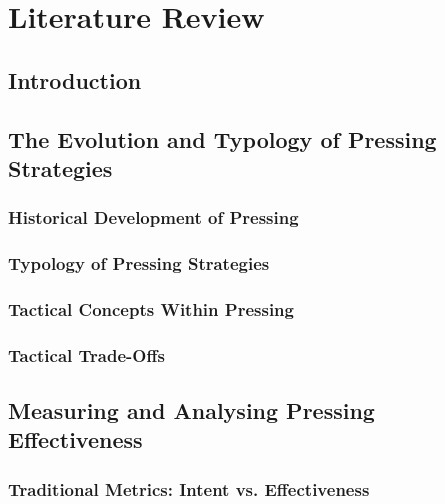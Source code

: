 \documentclass[12pt]{article}
\begin{document}
\tableofcontents
\pagebreak

\section{Literature Review}

\subsection{Introduction}




\subsection{The Evolution and Typology of Pressing Strategies}

\subsubsection{Historical Development of Pressing}



\subsubsection{Typology of Pressing Strategies}



\subsubsection{Tactical Concepts Within Pressing}



\subsubsection{Tactical Trade-Offs}


\subsection{Measuring and Analysing Pressing Effectiveness}

\subsubsection{Traditional Metrics: Intent vs. Effectiveness}
\end{document}
